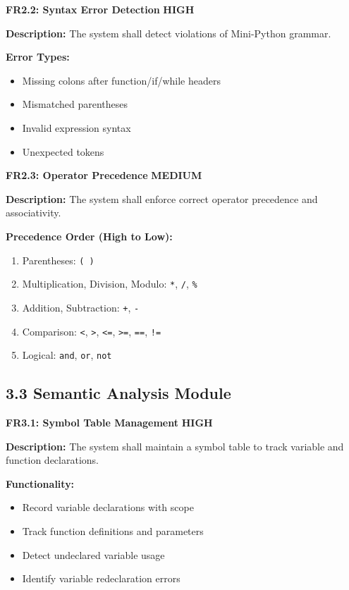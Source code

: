 \documentclass[a4paper,11pt]{article}
\newcommand{\priority}[1]{\colorbox{red!20}{\textbf{#1}}}
\begin{document}
\vspace{3mm}
\textbf{FR2.2: Syntax Error Detection} \priority{HIGH}

\textbf{Description:} The system shall detect violations of Mini-Python grammar.

\textbf{Error Types:}
\begin{itemize}
    \item Missing colons after function/if/while headers
    \item Mismatched parentheses
    \item Invalid expression syntax
    \item Unexpected tokens
\end{itemize}

\vspace{3mm}
\textbf{FR2.3: Operator Precedence} \priority{MEDIUM}

\textbf{Description:} The system shall enforce correct operator precedence and associativity.

\textbf{Precedence Order (High to Low):}
\begin{enumerate}
    \item Parentheses: \texttt{( )}
    \item Multiplication, Division, Modulo: \texttt{*}, \texttt{/}, \texttt{\%}
    \item Addition, Subtraction: \texttt{+}, \texttt{-}
    \item Comparison: \texttt{<}, \texttt{>}, \texttt{<=}, \texttt{>=}, \texttt{==}, \texttt{!=}
    \item Logical: \texttt{and}, \texttt{or}, \texttt{not}
\end{enumerate}

\subsection{3.3 Semantic Analysis Module}

\textbf{FR3.1: Symbol Table Management} \priority{HIGH}

\textbf{Description:} The system shall maintain a symbol table to track variable and function declarations.

\textbf{Functionality:}
\begin{itemize}
    \item Record variable declarations with scope
    \item Track function definitions and parameters
    \item Detect undeclared variable usage
    \item Identify variable redeclaration errors
\end{itemize}
\end{document}
